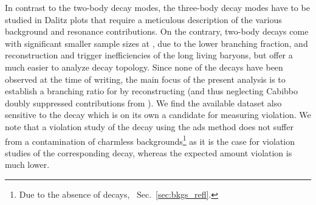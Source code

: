 In contrast to the two-body decay modes, the three-body decay modes have to be studied in Dalitz plots that require a meticulous description of the various background and resonance contributions.
On the contrary, two-body decays come with significant smaller sample sizes at \lhcb, due to the lower branching fraction, and reconstruction and trigger inefficiencies of the long living \Lz baryons, but offer a much easier to analyze decay topology.
Since none of the \decay{\Lb}{\PD\Lz} decays have been observed at the time of writing, the main focus of the present analysis is to establish a branching ratio for \decay{\Lb}{\Dz\Lz} by reconstructing \decay{\Dz}{\Km\pip} (and thus neglecting Cabibbo doubly suppressed contributions from \decay{\Lb}{\Dzb\Lz}).
We find the available dataset also sensitive to the decay \decay{\Xibz}{\Dz\Lz} which is on its own a candidate for measuring \CP violation.
We note that a \CP violation study of the \Xibz decay using the \gls{ads} method does not suffer from a contamination of charmless backgrounds\footnote{Due to the absence of \decay{\Xibz}{\Lz\Kp\pim} decays, \cf{}~Sec.~\ref{sec:bkgs_refl}.} as it is the case for \CP violation studies of the corresponding \Lb decay, whereas the expected amount \CP violation is much lower.
